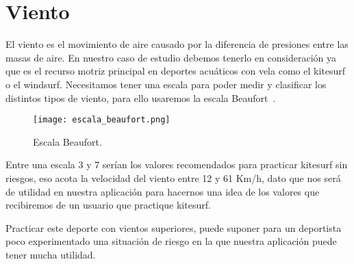 \section{Viento}

El viento es el movimiento de aire causado por la diferencia de presiones entre
 las masas de aire. En nuestro caso de estudio debemos tenerlo en consideración 
ya que es el recurso motriz principal en deportes acuáticos con vela como el kitesurf 
o el windsurf. Necesitamos tener una escala para poder medir y clasificar los distintos
 tipos de viento, para ello usaremos la escala Beaufort~\cite{BEAUFORT}.

\begin{figure}[hb]
  \texttt{[image: escala\_beaufort.png]} 
  \caption{Escala Beaufort.}
\end{figure}

Entre una escala 3 y 7 serían los valores recomendados para practicar kitesurf sin riesgos,
 eso acota la velocidad del viento entre 12 y 61 Km/h, dato que nos será de utilidad
 en nuestra aplicación para hacernos una idea de los valores que recibiremos de
 un usuario que practique kitesurf. 

Practicar este deporte con vientos superiores, puede suponer para un deportista
 poco experimentado una situación de riesgo en la que nuestra aplicación puede
 tener mucha utilidad.
